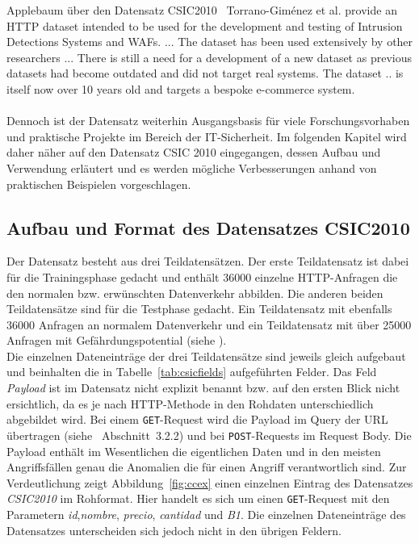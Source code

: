 \textcolor{bhtGray}{ Applebaum über den Datensatz CSIC2010~\cite{Applebaum2021}} Torrano-Giménez et al. provide an HTTP dataset intended to be used for the development and testing of Intrusion Detections Systems and WAFs. ... The dataset has been used extensively by other researchers ... There is still a need for a development of a new dataset as previous datasets had become outdated and did not target real systems. The dataset .. is itself now over 10 years old and targets a bespoke e-commerce system. \\\\

Dennoch ist der Datensatz weiterhin Ausgangsbasis für viele Forschungsvorhaben und praktische Projekte im Bereich der IT-Sicherheit. Im folgenden Kapitel wird daher näher auf den Datensatz CSIC 2010 eingegangen, dessen Aufbau und Verwendung erläutert und es werden mögliche Verbesserungen anhand von praktischen Beispielen vorgeschlagen.
%

\subsection{Aufbau und Format des Datensatzes CSIC2010}
\label{sec:aufbauformat}

Der Datensatz besteht aus drei Teildatensätzen. Der erste Teildatensatz ist dabei für die Trainingsphase gedacht und enthält 36000 einzelne HTTP-Anfragen die den normalen bzw. erwünschten Datenverkehr abbilden. Die anderen beiden Teildatensätze sind für die Testphase gedacht. Ein Teildatensatz mit ebenfalls 36000 Anfragen an normalem Datenverkehr und ein Teildatensatz mit über 25000 Anfragen mit Gefährdungspotential (siehe \cite{csic2010}).\\

Die einzelnen Dateneinträge der drei Teildatensätze sind jeweils gleich aufgebaut und beinhalten die in Tabelle~\ref{tab:csicfields} aufgeführten Felder. Das Feld \emph{Payload} ist im Datensatz nicht explizit benannt bzw. auf den ersten Blick nicht ersichtlich, da es je nach HTTP-Methode in den Rohdaten unterschiedlich abgebildet wird. Bei einem \verb=GET=-Request wird die Payload im Query der URL übertragen (siehe \cite{rfc2626}~Abschnitt~3.2.2) und bei \verb=POST=-Requests im Request Body. Die Payload enthält im Wesentlichen die eigentlichen Daten und in den meisten Angriffsfällen genau die Anomalien die für einen Angriff verantwortlich sind. Zur Verdeutlichung zeigt Abbildung~\ref{fig:ccex} einen einzelnen Eintrag des Datensatzes \emph{CSIC2010} im Rohformat. Hier handelt es sich um einen \verb=GET=-Request mit den Parametern \emph{id},\emph{nombre}, \emph{precio}, \emph{cantidad} und \emph{B1}. Die einzelnen Dateneinträge des Datensatzes unterscheiden sich jedoch nicht in den übrigen Feldern.\\

